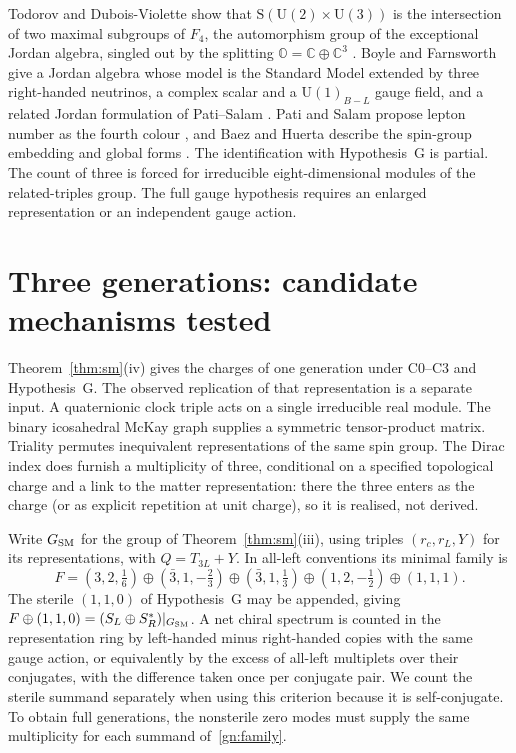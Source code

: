 \documentclass[aps,pra,onecolumn,superscriptaddress,nofootinbib,10pt]{revtex4-2}
\theoremstyle{definition}
\theoremstyle{remark}
\newcommand{\U}{\mathrm{U}}
\begin{document}
Todorov and Dubois-Violette show that $\mathrm S(\U(2)\times\U(3))$ is the intersection of two maximal subgroups of
$F_4$, the automorphism group of the exceptional Jordan algebra, singled out by the splitting
\(\mathbb O=\mathbb C\oplus\mathbb C^3\) \cite{tr:TodorovDV}.  Boyle and Farnsworth give a Jordan algebra whose
model is the Standard Model extended by three right-handed neutrinos, a complex scalar and a $\U(1)_{B-L}$ gauge
field, and a related Jordan formulation of Pati--Salam \cite{tr:BoyleFarnsworth}. Pati and Salam propose
lepton number as the fourth colour \cite{PatiSalam}, and
Baez and Huerta describe the spin-group embedding and global
forms \cite[\S3]{BaezHuerta}.
The identification with Hypothesis~G is partial. The count of
three is forced for irreducible eight-dimensional modules of
the related-triples group. The full gauge hypothesis requires
an enlarged representation or an independent gauge action.

\section{Three generations: candidate mechanisms tested}\label{sec:generations}

Theorem~\ref{thm:sm}(iv) gives the charges of one generation under
C0--C3 and Hypothesis~G. The observed replication of that representation is a separate
input. A quaternionic clock triple acts on a single irreducible real module.
The binary icosahedral McKay graph supplies a symmetric tensor-product
matrix. Triality permutes inequivalent representations of the same spin
group. The Dirac index does furnish a multiplicity of three, conditional on
a specified topological charge and a link to the matter representation: there the
three enters as the charge (or as explicit repetition at unit charge), so it is realised, not derived.

Write $G_{\rm SM}$ for the group of Theorem~\ref{thm:sm}(iii), using triples
$(r_c,r_L,Y)$ for its representations, with $Q=T_{3L}+Y$. In all-left
conventions its minimal family is
\begin{equation}\label{gn:family}
 F=(3,2,\tfrac16)\oplus(\bar3,1,-\tfrac23)\oplus
   (\bar3,1,\tfrac13)\oplus(1,2,-\tfrac12)\oplus(1,1,1).
\end{equation}
The sterile $(1,1,0)$ of Hypothesis~G may be appended, giving
$F\oplus(1,1,0)=(S_L\oplus S_R^*)|_{G_{\rm SM}}$.
A net chiral spectrum is counted in the representation ring by
left-handed minus right-handed copies with the same gauge action, or
equivalently by the excess of all-left multiplets over their conjugates,
with the difference taken once per conjugate pair. We count the sterile
summand separately when using this criterion because it is self-conjugate.
To obtain full generations, the nonsterile zero modes must supply the
same multiplicity for each summand of~\eqref{gn:family}.
\end{document}
